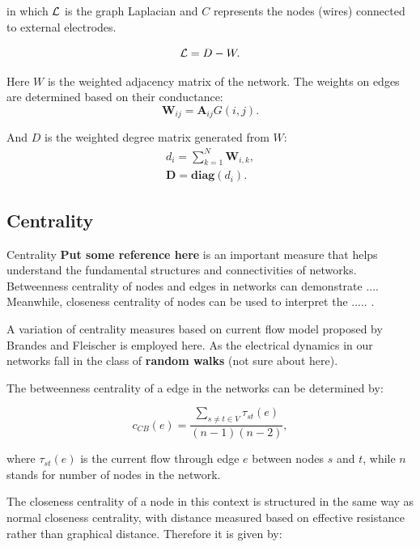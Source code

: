 \documentclass[fleqn,10pt,  reprint, amsmath,amssymb,aps, floatfix]{wlscirep}
\begin{document}
in which $\cal L$ is the graph Laplacian and $C$ represents the nodes (wires) connected to external electrodes. 

\begin{equation}
{\cal L} = D - W.
\end{equation}

Here $W$ is the weighted adjacency matrix of the network. The weights on edges are determined based on their conductance:
\begin{equation}
	\mathbf W_{ij} = \mathbf A_{ij} G(i,j).
\end{equation}

And $D$ is the weighted degree matrix generated from $W$:
\begin{align}
	d_i = \sum \limits_{k=1}^{N} \mathbf W_{i,k},\\
	\mathbf D = \textbf{diag}(d_i).
\end{align}


\subsection*{Centrality}
Centrality \textbf{Put some reference here} is an important measure that helps understand the fundamental structures and connectivities of networks. Betweenness centrality of nodes and edges in networks can demonstrate .... Meanwhile, closeness centrality of nodes can be used to interpret the ..... \cite{Newman2010}.

A variation of centrality measures based on current flow model proposed by Brandes and Fleischer \cite{Brandes2005} is employed here. As the electrical dynamics in our networks fall in the class of \textbf{random walks} (not sure about here).

The betweenness centrality of a edge in the networks can be determined by:

\begin{equation}
c_{CB}(e) = \frac{\sum \limits_{s \neq t \in V}\tau_{st}(e)}{(n-1)(n-2)},
\label{eq:ebc}
\end{equation}



where $\tau_{st}(e)$ is the current flow through edge $e$ between nodes $s$ and $t$, while $n$ stands for number of nodes in the network.

The closeness centrality of a node in this context is structured in the same way as normal closeness centrality, with distance measured based on effective resistance rather than graphical distance. Therefore it is given by:
\end{document}
